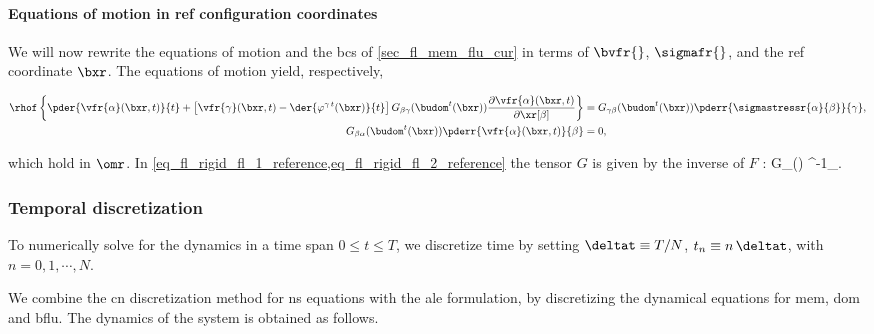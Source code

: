 \paragraph{Equations of motion in  \acl{ref} configuration coordinates}
\label{sec_fl_mem_flu_ref}

We will now rewrite the equations of motion and the \acp{bc} of \cref{sec_fl_mem_flu_cur} in terms of $\bvfr{}$, $\sigmafr{}$, and the \ac{ref} coordinate $\bxr$. The equations of motion \crefs{\eqsbfluc} yield, respectively,


\bw
\begin{align}
        \label{eq_fl_rigid_fl_1_reference}
        \rhof \left\{ \pder{ \vfr{\alpha}(\bxr, t)}{t} + \left[ \vfr{\gamma}(\bxr, t)  - \der{\varphi^{\gamma\, t}(\bxr)}{t}\right]  G_{\beta \gamma}(\budom^t(\bxr)) \frac{\partial  \vfr{\alpha}(\bxr, t)}{\partial \xr[\beta]} \right\} & =
        G_{\gamma \beta}(\budom^t(\bxr))  \pderr{\sigmastressr{\alpha}{\beta}}{\gamma},                                                                                                                                                           \\
        \label{eq_fl_rigid_fl_2_reference}
        G_{\beta \alpha}(\budom^t(\bxr)) \pderr{ \vfr{\alpha}(\bxr, t)}{\beta}                                                                                                                                                             & = 0,
\end{align}
\ew

which hold in $\omr$. In \cref{eq_fl_rigid_fl_1_reference,eq_fl_rigid_fl_2_reference} the tensor $G$ is given by the inverse of $F$ \cite{kamenskyLectureNotesMAE}:
\be
\label{eq_def_G}
G_{\alpha \beta}(\bu) \equiv [F(\bu)]^{-1}_{\alpha \beta}.
\ee\vspace{5mm}




\subsubsection{Temporal discretization}\label{sec_temp_discretization_mem}

To numerically solve for the dynamics in a time span $0 \leq t \leq T$, we discretize time by setting $\deltat \equiv T/N$, $t_n \equiv n\, \deltat$, with $n = 0, 1, \cdots, N$.

We combine the \ac{cn} discretization method for \ac{ns} equations \cite{loggAutomatedSolutionDifferential2012,crankPracticalMethodNumerical1947} with the \ac{ale} formulation, by discretizing the dynamical equations for \ac{mem}, \ac{dom} and \ac{bflu}.
The  dynamics of the system is obtained as follows.\\ \vspace{5mm}





